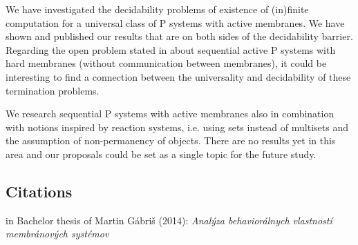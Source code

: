 \documentclass[a4paper,12pt,oneside,openany]{article}
\begin{document}
We have investigated the decidability problems of existence of (in)finite
computation for a universal class of P systems with active membranes.
We have shown and published our results that are on both sides of the
decidability barrier. Regarding the open problem stated in about
sequential active P systems with hard membranes (without
communication between membranes), it could be interesting to find a
connection between the universality and decidability of these termination
problems.

We research sequential P systems with active membranes also in
combination with notions inspired by reaction systems, i.e. using sets
instead of multisets and the assumption of non-permanency of objects.
There are no results yet in this area and our proposals could be set as a
single topic for the future study.

\begin{bibunit}[plain]
\nocite{*}
\renewcommand{\refname}{Bibliography}
\putbib[autoreferat]
\end{bibunit}
\begin{bibunit}[plain]
\nocite{*}
\renewcommand{\refname}{Own publications}
\section*{Citations}
\cite{Kovac14Inhibitors} in Bachelor thesis of Martin Gábriš (2014): {\em Analýza behaviorálnych vlastností membránových systémov}
\end{bibunit}
\end{document}

